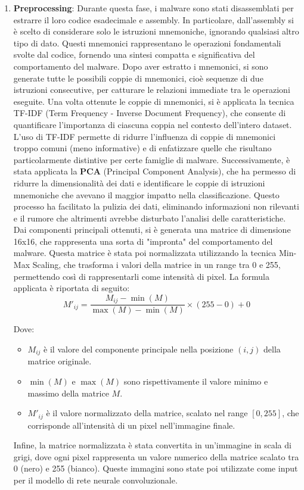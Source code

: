 \begin{enumerate}
    \item \textbf{Preprocessing}: Durante questa fase, i malware sono stati disassemblati per estrarre il loro codice esadecimale e assembly. In particolare, dall'assembly si è scelto di considerare solo le istruzioni mnemoniche, ignorando qualsiasi altro tipo di dato. Questi mnemonici rappresentano le operazioni fondamentali svolte dal codice, fornendo una sintesi compatta e significativa del comportamento del malware. Dopo aver estratto i mnemonici, si sono generate tutte le possibili coppie di mnemonici, cioè sequenze di due istruzioni consecutive, per catturare le relazioni immediate tra le operazioni eseguite.
    Una volta ottenute le coppie di mnemonici, si è applicata la tecnica TF-IDF (Term Frequency - Inverse Document Frequency), che consente di quantificare l'importanza di ciascuna coppia nel contesto dell'intero dataset. L'uso di TF-IDF permette di ridurre l'influenza di coppie di mnemonici troppo comuni (meno informative) e di enfatizzare quelle che risultano particolarmente distintive per certe famiglie di malware. Successivamente, è stata applicata la \textbf{PCA} (Principal Component Analysis), che ha permesso di ridurre la dimensionalità dei dati e identificare le coppie di istruzioni mnemoniche che avevano il maggior impatto nella classificazione. Questo processo ha facilitato la pulizia dei dati, eliminando informazioni non rilevanti e il rumore che altrimenti avrebbe disturbato l'analisi delle caratteristiche.
    Dai componenti principali ottenuti, si è generata una matrice di dimensione 16x16, che rappresenta una sorta di "impronta" del comportamento del malware. Questa matrice è stata poi normalizzata utilizzando la tecnica Min-Max Scaling, che trasforma i valori della matrice in un range tra 0 e 255, permettendo così di rappresentarli come intensità di pixel.
    La formula applicata è riportata di seguito:
    \[
    M'_{ij} = \frac{M_{ij} - \min(M)}{\max(M) - \min(M)} \times (255 - 0) + 0
    \]

    Dove:
    \begin{itemize}
    \item \( M_{ij} \) è il valore del componente principale nella posizione \( (i, j) \) della matrice originale.
    \item \( \min(M) \) e \( \max(M) \) sono rispettivamente il valore minimo e massimo della matrice \( M \).
    \item \( M'_{ij} \) è il valore normalizzato della matrice, scalato nel range \( [0, 255] \), che corrisponde all'intensità di un pixel nell'immagine finale.
    \end{itemize}
    Infine, la matrice normalizzata è stata convertita in un'immagine in scala di grigi, dove ogni pixel rappresenta un valore numerico della matrice scalato tra 0 (nero) e 255 (bianco). Queste immagini sono state poi utilizzate come input per il modello di rete neurale convoluzionale.


\end{enumerate}
